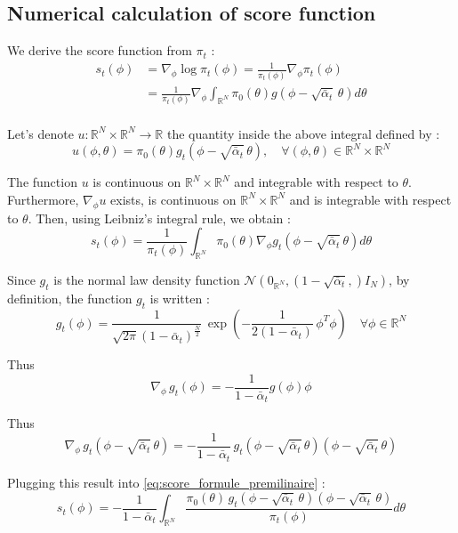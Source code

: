 \documentclass[a4paper,10pt]{article}
\theoremstyle{definition} %
\theoremstyle{definition} %
\theoremstyle{definition} %
\theoremstyle{definition} %
\newcommand{\R}{\mathbb{R}}
\begin{document}
\subsection{Numerical calculation of score function}
We derive the score function from $\pi_t$ :
\begin{align*}
        s_t(\phi) &= \nabla_\phi \log \pi_t(\phi) = \frac{1}{\pi_t(\phi)}\nabla_\phi\pi_t(\phi) \\
        &= \frac{1}{\pi_t(\phi)}\nabla_\phi\int_{\R^N} \pi_0(\theta) g(\phi - \sqrt{\bar \alpha_t} \,\theta) d\theta\\
\end{align*}

Let's denote $u: \R^N \times \R^N \rightarrow \R$ the quantity inside the above integral defined by :
\[u(\phi,\theta) =  \pi_0(\theta) g_t(\phi - \sqrt{\bar \alpha_t}\,\theta), \quad \forall (\phi,\theta) \in \R^N \times \R^N\]


The function $u$ is continuous on $\R^N \times \R^N$ and integrable with respect to $\theta$. Furthermore, $\nabla_\phi u$ exists, is continuous on $\R^N \times \R^N$ and is integrable with respect to $\theta$. Then, using Leibniz's integral rule, we obtain :
\begin{equation}\label{eq:score_formule_premilinaire}
    s_t(\phi) = \frac{1}{\pi_t(\phi)} \int_{\R^N} \pi_0(\theta) \nabla_\phi g_t(\phi - \sqrt{\bar \alpha_t} \,\theta) d\theta 
\end{equation}


Since $g_t$ is the normal law density function $\mathcal{N}\left(0_{\R^N}, (1-\sqrt{\bar \alpha _t},)I_N\right)$, by definition, the function $g_t$ is written :
\begin{equation*}
    g_t(\phi) = \frac{1}{\sqrt{2\pi}(1-\bar \alpha_t)^{\frac{N}{2}}} \, \exp\left(-\frac{1}{2(1-\bar \alpha _t)}\,\phi^T\phi\right) \quad \forall \phi \in \R^N
\end{equation*}

Thus
\begin{equation*}
    \nabla_\phi \,g_t(\phi) = -\frac{1}{1-\bar \alpha_t}g(\phi)\phi
\end{equation*}

Thus
\begin{equation*}
    \nabla_\phi \,g_t(\phi - \sqrt{\bar \alpha_t} \,\theta) = -\frac{1}{1-\bar \alpha_t}\,g_t(\phi - \sqrt{\bar \alpha_t} \,\theta)(\phi - \sqrt{\bar \alpha_t} \,\theta)
\end{equation*}


Plugging this result into \eqref{eq:score_formule_premilinaire} :
\begin{equation}\label{eq:score_formule_analytique}
    s_t(\phi) = -\frac{1}{1- \bar \alpha_t} \int_{\R^N} \frac{\pi_0(\theta)\, g_t(\phi - \sqrt{\bar \alpha_t} \,\theta)(\phi - \sqrt{\bar \alpha_t} \,\theta)}{\pi_t(\phi)} d\theta
\end{equation}
\end{document}
